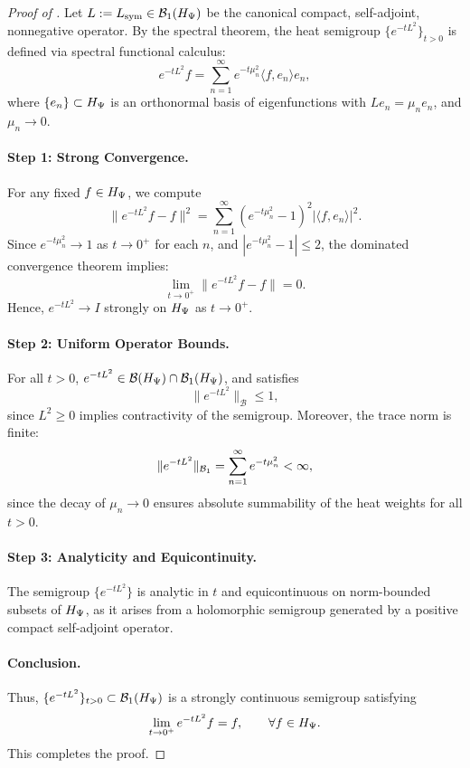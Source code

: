 \begin{proof}[Proof of ]
Let \( L := L_{\mathrm{sym}} \in \mathcal{B}_1(H_{\Psi}) \) be the canonical compact, self-adjoint, nonnegative operator. By the spectral theorem, the heat semigroup \( \{ e^{-tL^2} \}_{t > 0} \) is defined via spectral functional calculus:
\[
e^{-tL^2} f = \sum_{n=1}^\infty e^{-t \mu_n^2} \langle f, e_n \rangle e_n,
\]
where \( \{e_n\} \subset H_{\Psi} \) is an orthonormal basis of eigenfunctions with \( L e_n = \mu_n e_n \), and \( \mu_n \to 0 \).

\paragraph{Step 1: Strong Convergence.}
For any fixed \( f \in H_{\Psi} \), we compute
\[
\| e^{-t L^2} f - f \|^2 = \sum_{n=1}^\infty \left( e^{-t \mu_n^2} - 1 \right)^2 |\langle f, e_n \rangle|^2.
\]
Since \( e^{-t \mu_n^2} \to 1 \) as \( t \to 0^+ \) for each \( n \), and \( \left| e^{-t \mu_n^2} - 1 \right| \le 2 \), the dominated convergence theorem implies:
\[
\lim_{t \to 0^+} \| e^{-t L^2} f - f \| = 0.
\]
Hence, \( e^{-tL^2} \to I \) strongly on \( H_{\Psi} \) as \( t \to 0^+ \).

\paragraph{Step 2: Uniform Operator Bounds.}
For all \( t > 0 \), \( e^{-t L^2} \in \mathcal{B}(H_{\Psi}) \cap \mathcal{B}_1(H_{\Psi}) \), and satisfies
\[
\| e^{-t L^2} \|_{\mathcal{B}} \le 1,
\]
since \( L^2 \ge 0 \) implies contractivity of the semigroup. Moreover, the trace norm is finite:
\[
\| e^{-t L^2} \|_{\mathcal{B}_1} = \sum_{n=1}^\infty e^{-t \mu_n^2} < \infty,
\]
since the decay of \( \mu_n \to 0 \) ensures absolute summability of the heat weights for all \( t > 0 \).

\paragraph{Step 3: Analyticity and Equicontinuity.}
The semigroup \( \{ e^{-t L^2} \} \) is analytic in \( t \) and equicontinuous on norm-bounded subsets of \( H_{\Psi} \), as it arises from a holomorphic semigroup generated by a positive compact self-adjoint operator.

\paragraph{Conclusion.}
Thus, \( \{ e^{-t L^2} \}_{t > 0} \subset \mathcal{B}_1(H_{\Psi}) \) is a strongly continuous semigroup satisfying
\[
\lim_{t \to 0^+} e^{-t L^2} f = f, \qquad \forall f \in H_{\Psi}.
\]
This completes the proof.
\end{proof}

